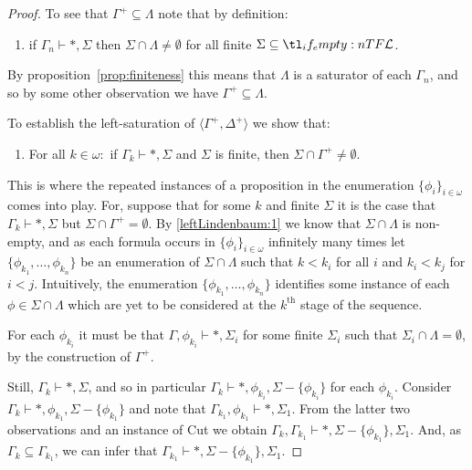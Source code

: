\documentclass[10pt]{article}
\begin{document}
\begin{lemma}
\begin{proof}
    To see that \(\Gamma^{+} \subseteq \Lambda\) note that by definition:
    \begin{enumerate}[label=(\arabic*)]
    \item\label{leftLindenbaum:1} if \(\Gamma_{n} \vdash \ast, \Sigma\) then \(\Sigma \cap \Lambda \ne \emptyset\) for all finite \(\Sigma \subseteq \olang{}\).
    \end{enumerate}
    By proposition~\ref{prop:finiteness} this means that \(\Lambda\) is a saturator of each \(\Gamma_{n}\), and so by some other observation we have \(\Gamma^{+} \subseteq \Lambda\).

    To establish the left-saturation of \(\langle \Gamma^{+},\Delta^{+} \rangle\) we show that:
    \begin{enumerate}[label=(\arabic*),resume]
    \item\label{leftLindenbaum:2} For all \(k \in \omega \colon\) if \(\Gamma_{k} \vdash \ast, \Sigma\) and \(\Sigma\) is finite, then \(\Sigma \cap \Gamma^{+} \ne \emptyset\).
    \end{enumerate}

    This is where the repeated instances of a proposition in the enumeration \(\{\phi_{i}\}_{i \in \omega}\) comes into play.
    For, suppose that for some \(k\) and finite \(\Sigma\) it is the case that \(\Gamma_{k} \vdash \ast, \Sigma\) but \(\Sigma \cap \Gamma^{+} = \emptyset\).
    By \ref{leftLindenbaum:1} we know that \(\Sigma \cap \Lambda\) is non-empty, and as each formula occurs in \(\{\phi_{i}\}_{i \in \omega}\) infinitely many times let \(\{\phi_{k_{1}}, \dots, \phi_{k_{n}}\}\) be an enumeration of \(\Sigma \cap \Lambda\) such that \(k < k_{i}\) for all \(i\) and \(k_{i} < k_{j}\) for \(i < j\).
    Intuitively, the enumeration \(\{\phi_{k_{1}}, \dots, \phi_{k_{n}}\}\) identifies some instance of each \(\phi \in \Sigma \cap \Lambda\) which are yet to be considered at the \(k^{\text{th}}\) stage of the sequence.

    For each \(\phi_{k_{i}}\) it must be that \mbox{\(\Gamma, \phi_{k_{i}} \vdash \ast, \Sigma_{i}\)} for some finite \(\Sigma_{i}\) such that \(\Sigma_{i} \cap \Lambda = \emptyset\), by the construction of \(\Gamma^{+}\).

    Still, \mbox{\(\Gamma_{k} \vdash \ast, \Sigma\)}, and so in particular \mbox{\(\Gamma_{k} \vdash \ast, \phi_{k_{i}},\Sigma - \{\phi_{k_{i}}\}\)} for each \(\phi_{k_{i}}\).
    Consider \mbox{\(\Gamma_{k} \vdash \ast, \phi_{k_{1}},\Sigma - \{\phi_{k_{1}}\}\)} and note that \mbox{\(\Gamma_{k_{1}}, \phi_{k_{1}} \vdash \ast, \Sigma_{1}\)}.
    From the latter two observations and an instance of Cut we obtain \mbox{\(\Gamma_{k}, \Gamma_{k_{1}} \vdash \ast, \Sigma - \{\phi_{k_{1}}\}, \Sigma_{1}\)}.
    And, as \mbox{\(\Gamma_{k} \subseteq \Gamma_{k_{1}}\)}, we can infer that \mbox{\(\Gamma_{k_{1}} \vdash \ast, \Sigma - \{\phi_{k_{1}}\}, \Sigma_{1}\)}.


\end{proof}
\end{lemma}
\end{document}
